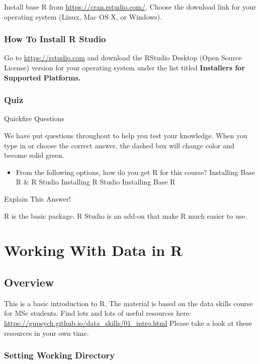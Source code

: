 \documentclass[]{book}
\providecommand{\tightlist}{%
  \setlength{\itemsep}{0pt}\setlength{\parskip}{0pt}}
\begin{document}
Install base R from \url{https://cran.rstudio.com/}. Choose the download
link for your operating system (Linux, Mac OS X, or Windows).

\subsection{How To Install R Studio}\label{how-to-install-r-studio}

Go to \url{https://rstudio.com} and download the RStudio Desktop (Open
Source License) version for your operating system under the list titled
\textbf{Installers for Supported Platforms.}

\subsection{Quiz}\label{quiz}

{Quickfire Questions}

We have put questions throughout to help you test your knowledge. When
you type in or choose the correct answer, the dashed box will change
color and become solid green.

\begin{itemize}
\tightlist
\item
  From the following options, how do you get R for this course?
  Installing Base R \& R Studio Installing R Studio Installing Base R
\end{itemize}

Explain This Answer!

R is the basic package. R Studio is an add-on that make R much easier to
use.

\chapter{Working With Data in R}\label{working-with-data-in-r}

\section{Overview}\label{overview-2}

This is a basic introduction to R. The material is based on the data
skills course for MSc students. Find lots and lots of useful resources
here: \url{https://gupsych.github.io/data_skills/01_intro.html} Please
take a look at these resources in your own time.

\subsection{Setting Working Directory}\label{setting-working-directory}
\end{document}
